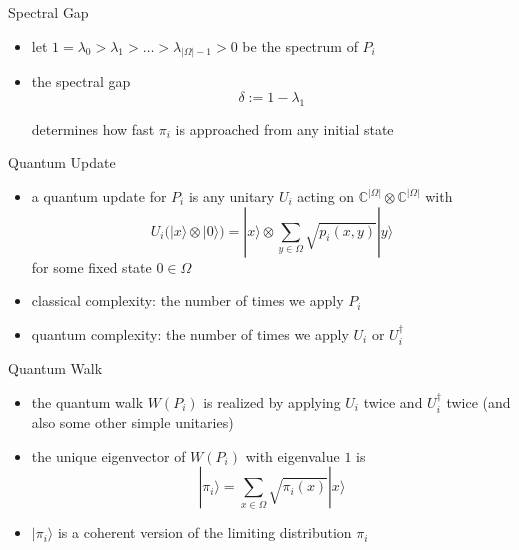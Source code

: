 \documentclass[slideColor]{prosper}
\newcommand{\C}{\mathbb C}
\renewcommand{\>}{\rangle}
\newcommand{\<}{\langle}
\begin{document}

\begin{slide}{Spectral Gap}

\begin{itemize}

\item let $1=\lambda_0 > \lambda_1 > \ldots > \lambda_{|\Omega|-1}>0$ be the spectrum of $P_i$

\bigskip
\item the spectral gap 
\[
\delta := 1 - \lambda_1
\]

\medskip
determines how fast $\pi_i$ is approached from any initial state
\end{itemize}
\end{slide}


\begin{slide}{Quantum Update}

\begin{itemize}
\item a quantum update for $P_i$ is any unitary $U_i$ acting on $\C^{|\Omega|}\otimes\C^{|\Omega|}$ with
\begin{equation*}
U_i \Big( |x\> \otimes |0\> \Big) = 
|x\> \otimes 
\sum_{y\in\Omega} \sqrt{p_i(x,y)} |y\> 
\end{equation*}
for some fixed state $0\in\Omega$

\bigskip
\item classical complexity: the number of times we apply $P_i$

\bigskip
\item quantum complexity: the number of times we apply $U_i$ or $U_i^\dagger$
\end{itemize}
\end{slide}


\begin{slide}{Quantum Walk}
\begin{itemize}
\item the quantum walk $W(P_i)$ is realized by applying $U_i$ twice and $U_i^\dagger$ twice (and also some other simple unitaries)

\bigskip
\item the unique eigenvector of $W(P_i)$ with eigenvalue $1$ is
\[
|\pi_i\> = \sum_{x\in\Omega} \sqrt{\pi_i(x)} |x\>
\]

\item
$|\pi_i\>$ is a coherent version of the limiting distribution $\pi_i$
\end{itemize}
\end{slide}
\end{document}
